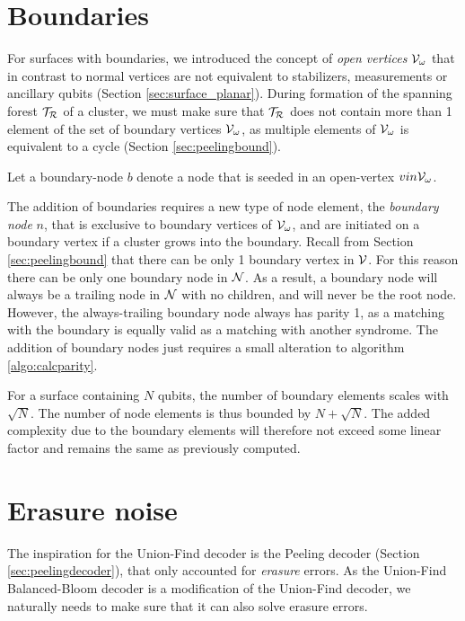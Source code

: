 \section{Boundaries}\label{sec:ufbbbound}
For surfaces with boundaries, we introduced the concept of \emph{open vertices} $\mathcal{V}_\omega$ that in contrast to normal vertices are not equivalent to stabilizers, measurements or ancillary qubits (Section \ref{sec:surface_planar}). During formation of the spanning forest $\mathcal{T}_{\mathcal{R}}$ of a cluster, we must make sure that $\mathcal{T}_{\mathcal{R}}$ does not contain more than 1 element of the set of boundary vertices $\mathcal{V}_\omega$, as multiple elements of $\mathcal{V}_\omega$ is equivalent to a cycle (Section \ref{sec:peelingbound}).
\begin{definition}\label{def:boundarynode}
  Let a boundary-node $b$ denote a node that is seeded in an open-vertex $v in \mathcal{V}_\omega$. 
\end{definition}
The addition of boundaries requires a new type of node element, the \emph{boundary node} $n$, that is exclusive to boundary vertices of $\mathcal{V}_\omega$, and are initiated on a boundary vertex if a cluster grows into the boundary. Recall from Section \ref{sec:peelingbound} that there can be only 1 boundary vertex in $\mathcal{V}$. For this reason there can be only one boundary node in $\mathcal{N}$. As a result, a boundary node will always be a trailing node in $\mathcal{N}$ with no children, and will never be the root node. However, the always-trailing boundary node  always has parity 1, as a matching with the boundary is equally valid as a matching with another syndrome. The addition of boundary nodes just requires a small alteration to algorithm \ref{algo:calcparity}.


For a surface containing $N$ qubits, the number of boundary elements scales with $\sqrt{N}$. The number of node elements is thus bounded by $N + \sqrt{N}$. The added complexity due to the boundary elements will therefore not exceed some linear factor and remains the same as previously computed.

\section{Erasure noise}\label{sec:ufbberasure}

The inspiration for the Union-Find decoder is the Peeling decoder (Section \ref{sec:peelingdecoder}), that only accounted for \emph{erasure} errors. As the Union-Find Balanced-Bloom decoder is a modification of the Union-Find decoder, we naturally needs to make sure that it can also solve erasure errors.

